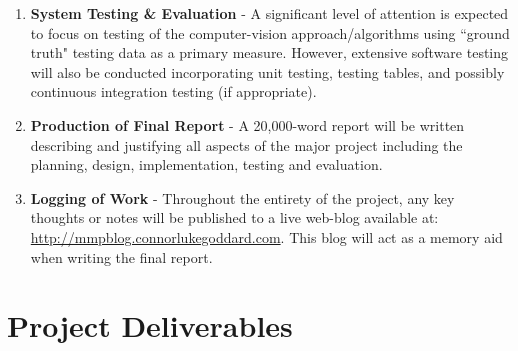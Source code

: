 \documentclass[10pt,fleqn,twoside]{article}
\begin{document}
\begin{enumerate}
	\item \textbf{System Testing \& Evaluation} - A significant level of attention is expected to focus on testing of the computer-vision approach/algorithms using ``ground truth" testing data as a primary measure. However, extensive software testing will also be conducted incorporating unit testing, testing tables, and possibly continuous integration testing (if appropriate).
	
	\item \textbf{Production of Final Report} - A 20,000-word report will be written describing and justifying all aspects of the major project including the planning, design, implementation, testing and evaluation.
	
	\item \textbf{Logging of Work} - Throughout the entirety of the project, any key thoughts or notes will be published to a live web-blog available at: \url{http://mmpblog.connorlukegoddard.com}. This blog will act as a memory aid when writing the final report.

\end{enumerate}


\section{Project Deliverables}
\end{document}
